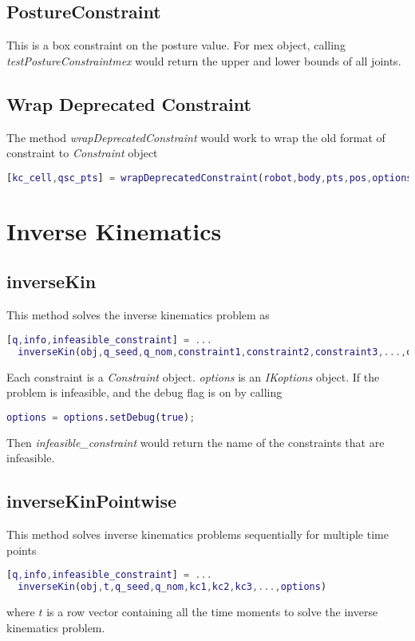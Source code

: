 \documentclass{article}
\begin{document}
\subsection{PostureConstraint}
This is a box constraint on the posture value. For mex object, calling \textsl{testPostureConstraintmex} would return the upper and lower bounds of all joints.
\subsection{Wrap Deprecated Constraint}
The method \textsl{wrapDeprecatedConstraint} would work to wrap the old format of constraint to \textsl{Constraint} object
\begin{lstlisting}[language=MATLAB]
[kc_cell,qsc_pts] = wrapDeprecatedConstraint(robot,body,pts,pos,options)
\end{lstlisting}
\section{Inverse Kinematics}
\subsection{inverseKin}
This method solves the inverse kinematics problem as
\begin{lstlisting}[language=MATLAB]
[q,info,infeasible_constraint] = ...
  inverseKin(obj,q_seed,q_nom,constraint1,constraint2,constraint3,...,options)
\end{lstlisting}
Each constraint is a \textsl{Constraint} object. \textsl{options} is an \textsl{IKoptions} object. If the problem is infeasible, and the debug flag is on by calling
\begin{lstlisting}[language=MATLAB]
options = options.setDebug(true);
\end{lstlisting}
Then \textsl{infeasible\_constraint} would return the name of the constraints that are infeasible.
\subsection{inverseKinPointwise}
This method solves inverse kinematics problems sequentially for multiple time points
\begin{lstlisting}[language=MATLAB]
 [q,info,infeasible_constraint] = ...
  inverseKin(obj,t,q_seed,q_nom,kc1,kc2,kc3,...,options)
\end{lstlisting}
where $t$ is a row vector containing all the time moments to solve the inverse kinematics problem.
\end{document}
